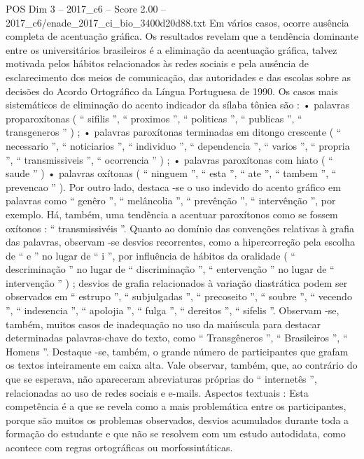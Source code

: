 \begin{textsample}{POS Dim 3 – 2017\_c6 – Score 2.00 – 2017\_c6/enade\_2017\_ci\_bio\_3400d20d88.txt}
Em vários casos, ocorre ausência completa de acentuação gráfica.
Os resultados revelam que a tendência dominante entre os universitários brasileiros é a eliminação da acentuação gráfica, talvez motivada pelos hábitos relacionados às redes sociais e pela ausência de esclarecimento dos meios de comunicação, das autoridades e das escolas sobre as decisões do Acordo Ortográfico da Língua Portuguesa de 1990.
Os casos mais sistemáticos de eliminação do acento indicador da sílaba tônica são : • palavras proparoxítonas ( “ sifilis ”, “ proximos ”, “ politicas ”, “ publicas ”, “ transgeneros ” ) ; • palavras paroxítonas terminadas em ditongo crescente ( “ necessario ”, “ noticiarios ”, “ individuo ”, “ dependencia ”, “ varios ”, “ propria ”, “ transmissiveis ”, “ ocorrencia ” ) ; • palavras paroxítonas com hiato ( “ saude ” ) • palavras oxítonas ( “ ninguem ”, “ esta ”, “ ate ”, “ tambem ”, “ prevencao ” ).
Por outro lado, destaca -se o uso indevido do acento gráfico em palavras como “ genêro ”, “ melâncolia ”, “ prevênção ”, “ intervênção ”, por exemplo.
Há, também, uma tendência a acentuar paroxítonos como se fossem oxítonos : “ transmissivéis ”.
Quanto ao domínio das convenções relativas à grafia das palavras, observam -se desvios recorrentes, como a hipercorreção pela escolha de “ e ” no lugar de “ i ”, por influência de hábitos da oralidade ( “ descriminação ” no lugar de “ discriminação ”, “ entervenção ” no lugar de “ intervenção ” ) ; desvios de grafia relacionados à variação diastrática podem ser observados em “ estrupo ”, “ subjulgadas ”, “ precoseito ”, “ soubre ”, “ vecendo ”, “ indesencia ”, “ apolojia ”, “ fulga ”, “ dereitos ”, “ sifelis ”.
Observam -se, também, muitos casos de inadequação no uso da maiúscula para destacar determinadas palavras-chave do texto, como “ Transgêneros ”, “ Brasileiros ”, “ Homens ”.
Destaque -se, também, o grande número de participantes que grafam os textos inteiramente em caixa alta.
Vale observar, também, que, ao contrário do que se esperava, não apareceram abreviaturas próprias do “ internetês ”, relacionadas ao uso de redes sociais e e-mails.
Aspectos textuais : Esta competência é a que se revela como a mais problemática entre os participantes, porque são muitos os problemas observados, desvios acumulados durante toda a formação do estudante e que não se resolvem com um estudo autodidata, como acontece com regras ortográficas ou morfossintáticas.

\end{textsample}
